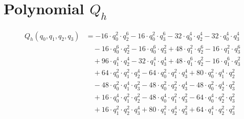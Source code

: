 \section{Polynomial $Q_h$}
\begin{align*}Q_h(q_0,q_1,q_2,q_3)&=-16\cdot q_0^{2}\cdot q_2^{6}-16\cdot q_0^{2}\cdot q_3^{6}-32\cdot q_0^{4}\cdot q_2^{4}-32\cdot q_0^{4}\cdot q_3^{4}\\
&\quad -16\cdot q_0^{6}\cdot q_2^{2}-16\cdot q_0^{6}\cdot q_3^{2}+48\cdot q_1^{2}\cdot q_2^{6}-16\cdot q_1^{2}\cdot q_3^{6}\\
&\quad +96\cdot q_1^{4}\cdot q_2^{4}-32\cdot q_1^{4}\cdot q_3^{4}+48\cdot q_1^{6}\cdot q_2^{2}-16\cdot q_1^{6}\cdot q_3^{2}\\
&\quad +64\cdot q_0^{2}\cdot q_1^{2}\cdot q_2^{4}-64\cdot q_0^{2}\cdot q_1^{2}\cdot q_3^{4}+80\cdot q_0^{2}\cdot q_1^{4}\cdot q_2^{2}\\
&\quad -48\cdot q_0^{2}\cdot q_1^{4}\cdot q_3^{2}-48\cdot q_0^{2}\cdot q_2^{2}\cdot q_3^{4}-48\cdot q_0^{2}\cdot q_2^{4}\cdot q_3^{2}\\
&\quad +16\cdot q_0^{4}\cdot q_1^{2}\cdot q_2^{2}-48\cdot q_0^{4}\cdot q_1^{2}\cdot q_3^{2}-64\cdot q_0^{4}\cdot q_2^{2}\cdot q_3^{2}\\
&\quad +16\cdot q_1^{2}\cdot q_2^{2}\cdot q_3^{4}+80\cdot q_1^{2}\cdot q_2^{4}\cdot q_3^{2}+64\cdot q_1^{4}\cdot q_2^{2}\cdot q_3^{2}\end{align*}
